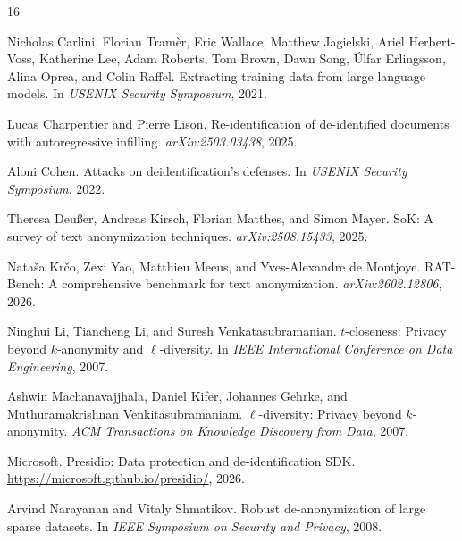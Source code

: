 \documentclass{article}
\begin{document}

\begin{thebibliography}{16}

Nicholas Carlini, Florian Tram{\`e}r, Eric Wallace, Matthew Jagielski, Ariel Herbert-Voss, Katherine Lee, Adam Roberts, Tom Brown, Dawn Song, {\'U}lfar Erlingsson, Alina Oprea, and Colin Raffel.
\newblock Extracting training data from large language models.
\newblock In \emph{USENIX Security Symposium}, 2021.

Lucas Charpentier and Pierre Lison.
\newblock Re-identification of de-identified documents with autoregressive infilling.
\newblock \emph{arXiv:2503.03438}, 2025.

Aloni Cohen.
\newblock Attacks on deidentification's defenses.
\newblock In \emph{USENIX Security Symposium}, 2022.

Theresa Deu{\ss}er, Andreas Kirsch, Florian Matthes, and Simon Mayer.
\newblock SoK: A survey of text anonymization techniques.
\newblock \emph{arXiv:2508.15433}, 2025.

Nata{\v{s}}a Kr{\v{c}}o, Zexi Yao, Matthieu Meeus, and Yves-Alexandre de Montjoye.
\newblock RAT-Bench: A comprehensive benchmark for text anonymization.
\newblock \emph{arXiv:2602.12806}, 2026.

Ninghui Li, Tiancheng Li, and Suresh Venkatasubramanian.
\newblock $t$-closeness: Privacy beyond $k$-anonymity and $\ell$-diversity.
\newblock In \emph{IEEE International Conference on Data Engineering}, 2007.

Ashwin Machanavajjhala, Daniel Kifer, Johannes Gehrke, and Muthuramakrishnan Venkitasubramaniam.
\newblock $\ell$-diversity: Privacy beyond $k$-anonymity.
\newblock \emph{ACM Transactions on Knowledge Discovery from Data}, 2007.

Microsoft.
\newblock Presidio: Data protection and de-identification SDK.
\newblock \url{https://microsoft.github.io/presidio/}, 2026.

Arvind Narayanan and Vitaly Shmatikov.
\newblock Robust de-anonymization of large sparse datasets.
\newblock In \emph{IEEE Symposium on Security and Privacy}, 2008.


\end{thebibliography}
\end{document}
